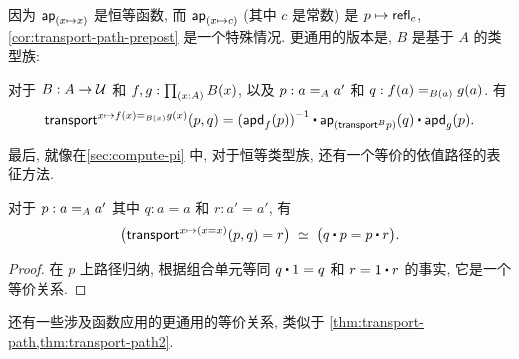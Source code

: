 因为 $\apfunc{(x \mapsto x)}$ 是恒等函数, 而 $\apfunc{(x \mapsto c)}$ (其中 $c$ 是常数) 是 $p \mapsto\refl{c}$, \cref{cor:transport-path-prepost} 是一个特殊情况.
更通用的版本是, $B$ 是基于 $A$ 的类型族:

\begin{thm}
    \label{thm:transport-path2}
    对于 $B : A \to \type$ 和 $f,g : \prd{x:A} B(x)$, 以及 $p : \id[A]{a}{a'}$ 和 $q : \id[B(a)]{f(a)}{g(a)}$.
    有
    \begin{equation*}
        \transfib{x \mapsto \id[B(x)]{f(x)}{g(x)}}{p}{q} =
        \opp{(\apdfunc{f}(p))} \ct \apfunc{(\transfibf{B}{p})}(q) \ct \apdfunc{g}(p).
    \end{equation*}
\end{thm}

最后, 就像在\cref{sec:compute-pi} 中, 对于恒等类型族, 还有一个等价的依值路径的表征方法.

\begin{thm}
    \label{thm:dpath-path}
    对于 $p:\id[A]a{a'}$ 其中 $q:a=a$ 和 $r:a'=a'$, 有
    \[ \eqvspaced{ \big(\transfib{x\mapsto (x=x)}{p}{q} = r \big) }{ \big( q \ct p = p \ct r \big). } \]
\end{thm}
\begin{proof}
    在 $p$ 上路径归纳, 根据组合单元等同 $q\ct 1 = q$ 和 $r = 1\ct r$ 的事实, 它是一个等价关系.
\end{proof}

还有一些涉及函数应用的更通用的等价关系, 类似于 \cref{thm:transport-path,thm:transport-path2}.

%